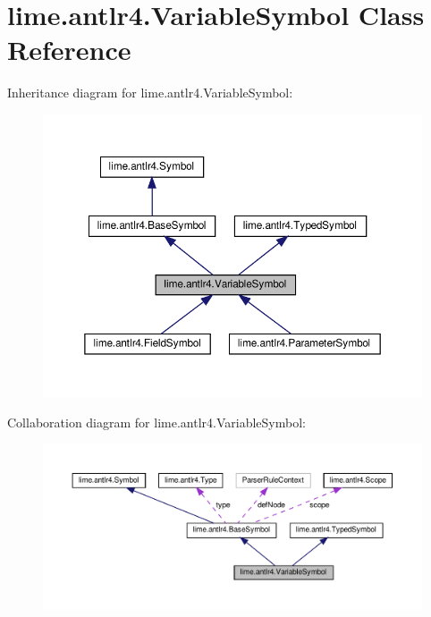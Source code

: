 \hypertarget{classlime_1_1antlr4_1_1VariableSymbol}{}\section{lime.\+antlr4.\+Variable\+Symbol Class Reference}
\label{classlime_1_1antlr4_1_1VariableSymbol}


Inheritance diagram for lime.\+antlr4.\+Variable\+Symbol\+:
\nopagebreak
\begin{figure}[H]
\begin{center}
\leavevmode
\includegraphics[width=350pt]{classlime_1_1antlr4_1_1VariableSymbol__inherit__graph}
\end{center}
\end{figure}


Collaboration diagram for lime.\+antlr4.\+Variable\+Symbol\+:
\nopagebreak
\begin{figure}[H]
\begin{center}
\leavevmode
\includegraphics[width=350pt]{classlime_1_1antlr4_1_1VariableSymbol__coll__graph}
\end{center}
\end{figure}

